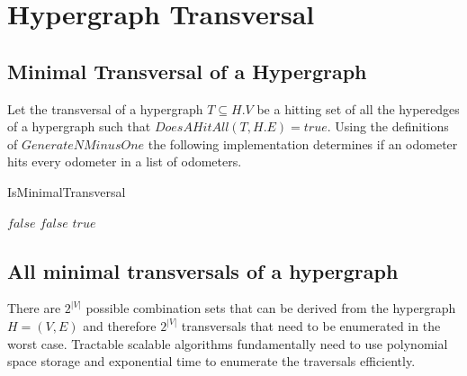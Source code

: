 \chapter{Hypergraph Transversal}
	
\section{Minimal Transversal of a Hypergraph}
Let the transversal of a hypergraph $T \subseteq H.V$ be a hitting set of all the hyperedges of a hypergraph such that $DoesAHitAll(T,H.E) = true$. Using the definitions of $GenerateNMinusOne$ the following implementation determines if an odometer hits every odometer in a list of odometers.\\

\begin{algorithm}
	\caption{IsMinimalTransversal}\label{IsMinimalTransversal}
	\begin{algorithmic}[1]
		\State \Return $false$
		\EndIf
		\State \Return $false$
		\EndIf
		\EndFor
		\State \Return $true$
		\EndFunction
	\end{algorithmic}
\end{algorithm}


\section{All minimal transversals of a hypergraph}
There are $2^{|V|}$ possible combination sets that can be derived from the hypergraph $H=(V,E)$ and therefore $2^{|V|}$ transversals that need to be enumerated in the worst case. Tractable scalable algorithms fundamentally need to use polynomial space storage and exponential time to enumerate the traversals efficiently.
